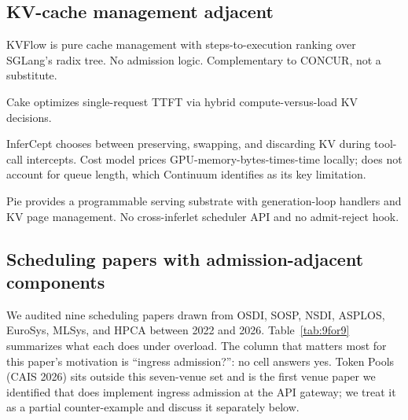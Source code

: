 \documentclass[11pt,letterpaper]{article}
\theoremstyle{definition}
\begin{document}
\subsection{KV-cache management adjacent}

KVFlow \cite{pan2025kvflow} is pure cache management with
steps-to-execution ranking over SGLang's radix tree. No admission
logic. Complementary to CONCUR, not a substitute.

Cake \cite{jin2025cake} optimizes single-request TTFT via hybrid
compute-versus-load KV decisions.

InferCept \cite{abhyankar2024infercept} chooses between preserving,
swapping, and discarding KV during tool-call intercepts. Cost model
prices GPU-memory-bytes-times-time locally; does not account for
queue length, which Continuum identifies as its key limitation.

Pie \cite{gim2025pie} provides a programmable serving substrate with
generation-loop handlers and KV page management. No cross-inferlet
scheduler API and no admit-reject hook.

\subsection{Scheduling papers with admission-adjacent components}

We audited nine scheduling papers drawn from OSDI, SOSP, NSDI,
ASPLOS, EuroSys, MLSys, and HPCA between 2022 and 2026.
Table~\ref{tab:9for9} summarizes what each does under overload. The
column that matters most for this paper's motivation is
``ingress admission?'': no cell answers yes. Token Pools (CAIS
2026) sits outside this seven-venue set and is the first venue
paper we identified that does implement ingress admission at the
API gateway; we treat it as a partial counter-example and discuss
it separately below.
\end{document}
